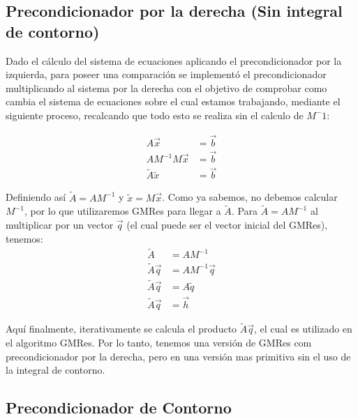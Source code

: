 \documentclass[fleqn]{article}
\begin{document}
\subsection{Precondicionador por la derecha (Sin integral de contorno)}

Dado el cálculo del sistema de ecuaciones aplicando el precondicionador por la izquierda, para poseer una comparación se implementó el precondicionador multiplicando al sistema por la derecha con el objetivo de comprobar como cambia el sistema de ecuaciones sobre el cual estamos trabajando, mediante el siguiente proceso, recalcando que todo esto se realiza sin el calculo de $M^-1$:

\begin{align*}
    A\vec{x} &= \vec{b} \\
    A M^{-1} M\vec{x} &= \vec{b} \\
    \widetilde{A}\widetilde{x} &= \vec{b}
\end{align*}

Definiendo así $\widetilde{A} = AM^{-1}$ y $\widetilde{x} = M\vec{x}$. Como ya sabemos, no debemos calcular $M^{-1}$, por lo que utilizaremos GMRes para llegar a $\widetilde{A}$. Para $\widetilde{A} = AM^{-1}$ al multiplicar por un vector $\vec{q}$ (el cual puede ser el vector inicial del GMRes), tenemos:
\begin{align*}
    \widetilde{A} &= AM^{-1} \\
    \widetilde{A}\vec{q} &= AM^{-1}\vec{q}\\
    \widetilde{A}\vec{q} &= A\widetilde{q}\\
    \widetilde{A}\vec{q} &= \vec{h}
\end{align*}

Aquí finalmente, iterativamente se calcula el producto $\widetilde{A}\vec{q}$, el cual es utilizado en el algoritmo GMRes. Por lo tanto, tenemos una versión de GMRes com precondicionador por la derecha, pero en una versión mas primitiva sin el uso de la integral de contorno.
 

\subsection{Precondicionador de Contorno}
\end{document}
